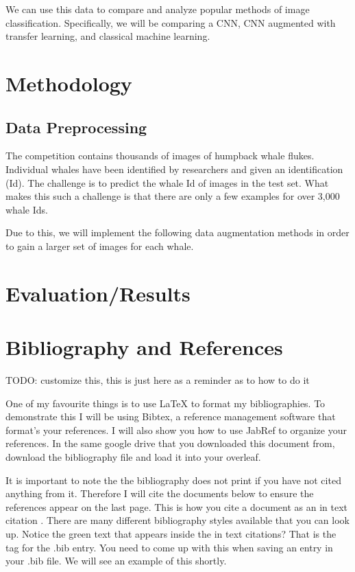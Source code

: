 \documentclass[paper=a4, fontsize=11pt]{scrartcl}
\numberwithin{equation}{section}		%
\numberwithin{table}{section}				%
\begin{document}
We can use this data to compare and analyze popular methods of image classification. Specifically, we will be comparing a CNN, CNN augmented with transfer learning, and classical machine learning.

\section{Methodology}\label{sec: meth}

\subsection{Data Preprocessing}

The competition contains thousands of images of humpback whale flukes. Individual whales have been identified by researchers and given an identification (Id). The challenge is to predict the whale Id of images in the test set. What makes this such a challenge is that there are only a few examples for over 3,000 whale Ids.

Due to this, we will implement the following data augmentation methods in order to gain a larger set of images for each whale.

\section{Evaluation/Results}\label{sec: results}

\section{Bibliography and References}\label{sec: bibliography}

TODO: customize this, this is just here as a reminder as to how to do it

One of my favourite things is to use \LaTeX{} to format my bibliographies. To demonstrate this I will be using Bibtex, a reference management software that format's your references. I will also show you how to use JabRef to organize your references. In the same google drive that you downloaded this document from, download the bibliography file and load it into your overleaf. 


It is important to note the the bibliography does not print if you have not cited anything from it. Therefore I will cite the documents below to ensure the references appear on the last page. This is how you cite a document as an in text citation \cite{Younespour2019}. There are many different bibliography styles available that you can look up. Notice the green text that appears inside the in text citations? That is the tag for the .bib entry. You need to come up with this when saving an entry in your .bib file. We will see an example of this shortly. 
\end{document}
